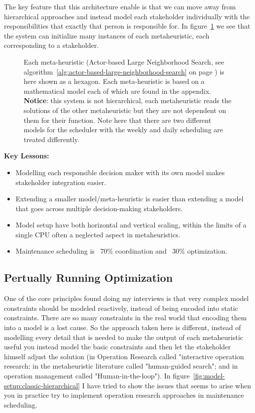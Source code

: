 The key feature that this architecture enable is that we can move away from hierarchical approaches and 
instead model each stakeholder individually with the responsibilities that exactly that person is responsible 
for. In figure~\ref{fig:model-setup:hexagon} we see that the system can initialize many instances of each metaheuristic, each corresponding to a stakeholder. 

\begin{figure}[H]
	
	\centering
	\drawModelSetupHexagon
	\caption{
		Each meta-heuristic (Actor-based Large Neighborhood Search, see algorithm~\ref{alg:actor-based-large-neighborhood-search} on page \pageref{alg:actor-based-large-neighborhood-search}) is here shown as a hexagon.
		Each meta-heuristic is based on a mathematical model each of which are found in the appendix. \textbf{Notice}: this system is not 
		hierarchical, each metaheuristic reads the solutions of the other metaheuristic but they are not dependent on them for their 
		function. Note here that there are two different models for the scheduler with the weekly and daily scheduling are treated differently.
	}
	\label{fig:model-setup:hexagon}
\end{figure}

\textbf{Key Lessons:}
\begin{itemize}
	\item Modelling each responsible decision maker with its own model makes stakeholder integration easier.
	\item Extending a smaller model/meta-heuristic is easier than extending a model that goes across multiple decision-making stakeholders.
	\item Model setup have both horizontal and vertical scaling, within the limits of a single CPU often a neglected aspect in metaheuristics. 
	\item Maintenance scheduling is ~70\% coordination and ~30\% optimization.
\end{itemize}

\subsection*{Pertually Running Optimization}
One of the core principles found doing my interviews is that very complex model constraints should be modeled reactively, instead 
of being encoded into static constraints. There are so many constraints in the real world that 
encoding them into a model is a lost cause. So the approach taken here is different, instead of modelling every
detail that is needed to make the output of each metaheuristic useful you instead model the basic constraints and then let 
the stakeholder himself adjust the solution (in Operation Research called "interactive operation research; in the metaheuristic literature called
"human-guided search"; and in operation management called "Human-in-the-loop"). In figure~\ref{fig:model-setup:classic-hierarchical} I have tried to show the issues 
that seems to arise when you in practice try to implement operation research approaches in maintenance scheduling.

